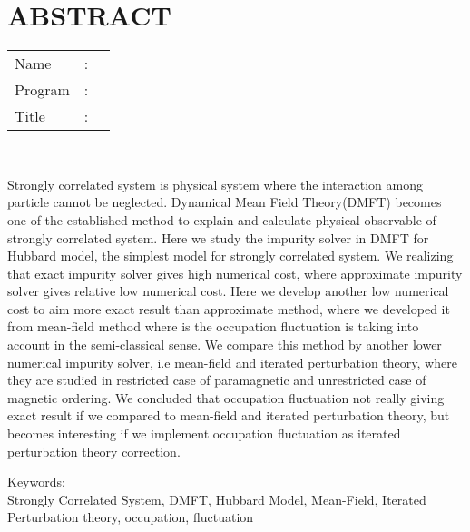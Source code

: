 %
%
%

\chapter*{ABSTRACT}

\vspace*{0.2cm}

\noindent \begin{tabular}{l l p{11.0cm}}
	Name&: & \penulis \\
	Program&: & \program \\
	Title&: & \judulInggris \\
\end{tabular} \\ 

\vspace*{0.5cm}

\noindent Strongly correlated system is physical system where the interaction among particle cannot be neglected. Dynamical Mean Field Theory(DMFT) becomes one of the established method to explain and calculate physical observable of strongly correlated system. Here we study the impurity solver in DMFT for Hubbard model, the simplest model for strongly correlated system. We realizing that exact impurity solver gives high numerical cost, where approximate impurity solver gives relative low numerical cost. Here we develop another low numerical cost to aim more exact result than approximate method, where we developed it from mean-field method where is the occupation fluctuation is taking into account in the semi-classical sense. We compare this method by another lower numerical impurity solver, i.e mean-field and iterated perturbation theory, where they are studied in restricted case of paramagnetic and unrestricted case of magnetic ordering. We concluded that occupation fluctuation not really giving exact result if we compared to mean-field and iterated perturbation theory, but becomes interesting if we implement occupation fluctuation as iterated perturbation theory correction.\\

\vspace*{0.2cm}

\noindent Keywords: \\ 
\noindent Strongly Correlated System, DMFT, Hubbard Model, Mean-Field, Iterated Perturbation theory, occupation, fluctuation

\newpage